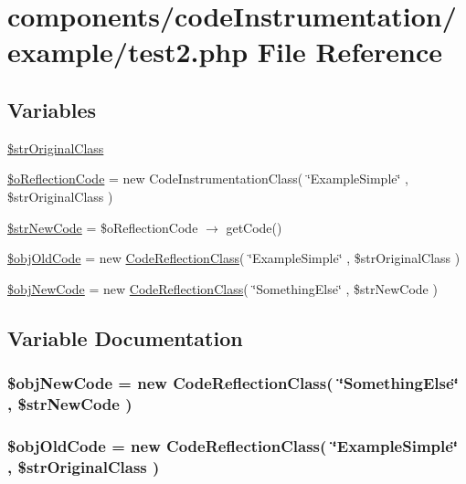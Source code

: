\hypertarget{test2_8php}{
\section{components/codeInstrumentation/example/test2.php File Reference}
\label{test2_8php}
}
\subsection*{Variables}
\begin{CompactItemize}
\item 
\hyperlink{test2_8php_1ac33ebb6e938d93add7631fafed358a}{\$strOriginalClass}
\item 
\hyperlink{test2_8php_dff853bfc3335950f89bfb9e1a779c7e}{\$oReflectionCode} = new CodeInstrumentationClass( \char`\"{}ExampleSimple\char`\"{} , \$strOriginalClass )
\item 
\hyperlink{test2_8php_882f0b62de6f379d0e0cf88ef6658601}{\$strNewCode} = \$oReflectionCode $\rightarrow$ getCode()
\item 
\hyperlink{test2_8php_34775dfd2d211eafdfc4ca0c32336a2a}{\$objOldCode} = new \hyperlink{class_code_reflection_class}{CodeReflectionClass}( \char`\"{}ExampleSimple\char`\"{} , \$strOriginalClass )
\item 
\hyperlink{test2_8php_2706d26c6080a6989ab38b87786b8935}{\$objNewCode} = new \hyperlink{class_code_reflection_class}{CodeReflectionClass}( \char`\"{}SomethingElse\char`\"{} , \$strNewCode )
\end{CompactItemize}


\subsection{Variable Documentation}
\hypertarget{test2_8php_2706d26c6080a6989ab38b87786b8935}{
\subsubsection[{\$objNewCode}]{\setlength{\rightskip}{0pt plus 5cm}\$objNewCode = new {\bf CodeReflectionClass}( \char`\"{}SomethingElse\char`\"{} , \$strNewCode )}}
\label{test2_8php_2706d26c6080a6989ab38b87786b8935}


\hypertarget{test2_8php_34775dfd2d211eafdfc4ca0c32336a2a}{
\subsubsection[{\$objOldCode}]{\setlength{\rightskip}{0pt plus 5cm}\$objOldCode = new {\bf CodeReflectionClass}( \char`\"{}ExampleSimple\char`\"{} , \$strOriginalClass )}}
\label{test2_8php_34775dfd2d211eafdfc4ca0c32336a2a}


